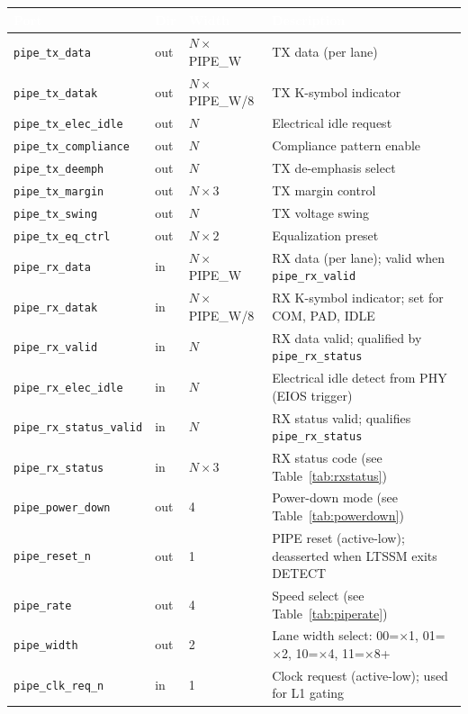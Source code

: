 \documentclass[11pt,a4paper]{article}
\newcommand{\theadcell}[1]{%
  \cellcolor{tablehead}\textcolor{white}{\textbf{#1}}}
\begin{document}
\begin{tabular}{lllp{7.5cm}}
  \toprule
  \theadcell{Port} & \theadcell{Dir} & \theadcell{Width} & \theadcell{Description} \\
  \midrule
  \texttt{pipe\_tx\_data}       & out & $N\times$PIPE\_W & TX data (per lane) \\
  \texttt{pipe\_tx\_datak}      & out & $N\times$PIPE\_W/8 & TX K-symbol indicator \\
  \texttt{pipe\_tx\_elec\_idle} & out & $N$ & Electrical idle request \\
  \texttt{pipe\_tx\_compliance} & out & $N$ & Compliance pattern enable \\
  \texttt{pipe\_tx\_deemph}     & out & $N$ & TX de-emphasis select \\
  \texttt{pipe\_tx\_margin}     & out & $N\times 3$ & TX margin control \\
  \texttt{pipe\_tx\_swing}      & out & $N$ & TX voltage swing \\
  \texttt{pipe\_tx\_eq\_ctrl}   & out & $N\times 2$ & Equalization preset \\
  \texttt{pipe\_rx\_data}       & in  & $N\times$PIPE\_W & RX data (per lane); valid when \texttt{pipe\_rx\_valid} \\
  \texttt{pipe\_rx\_datak}      & in  & $N\times$PIPE\_W/8 & RX K-symbol indicator; set for COM, PAD, IDLE \\
  \texttt{pipe\_rx\_valid}      & in  & $N$ & RX data valid; qualified by \texttt{pipe\_rx\_status} \\
  \texttt{pipe\_rx\_elec\_idle} & in  & $N$ & Electrical idle detect from PHY (EIOS trigger) \\
  \texttt{pipe\_rx\_status\_valid} & in & $N$ & RX status valid; qualifies \texttt{pipe\_rx\_status} \\
  \texttt{pipe\_rx\_status}     & in  & $N\times 3$ & RX status code (see Table~\ref{tab:rxstatus}) \\
  \texttt{pipe\_power\_down}    & out & 4 & Power-down mode (see Table~\ref{tab:powerdown}) \\
  \texttt{pipe\_reset\_n}       & out & 1 & PIPE reset (active-low); deasserted when LTSSM exits DETECT \\
  \texttt{pipe\_rate}           & out & 4 & Speed select (see Table~\ref{tab:piperate}) \\
  \texttt{pipe\_width}          & out & 2 & Lane width select: 00=$\times$1, 01=$\times$2, 10=$\times$4, 11=$\times$8+ \\
  \texttt{pipe\_clk\_req\_n}    & in  & 1 & Clock request (active-low); used for L1 gating \\
  \bottomrule
\end{tabular}
\end{document}
